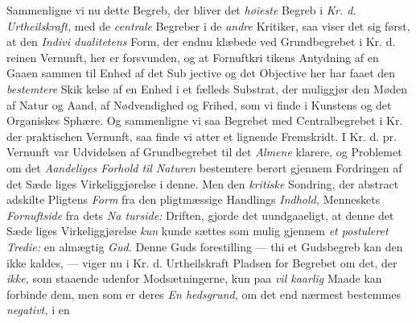 Sammenligne vi nu dette Begreb, der bliver det \emph{høieste}
Begreb i \emph{Kr. d. Urtheilskraft,} med de \emph{centrale} Begreber
i de \emph{andre} Kritiker, saa viser det sig først, at den \emph{Indivi\-%
dualitetens} Form, der endnu klæbede ved Grundbegrebet i
Kr. d. reinen Vernunft, her er forsvunden, og at Fornuftkri\-%
tikens Antydning af en Gaaen sammen til Enhed af det Sub\-%
jective og det Objective her har faaet den \emph{bestemtere} Skik\-%
kelse af en Enhed i et fælleds Substrat, der muliggjør den
Møden af Natur og Aand, af Nødvendighed og Frihed, som vi
finde i Kunstens og det Organiskes Sphære. Og sammenligne
vi saa Begrebet med Centralbegrebet i Kr. der praktischen
Vernunft, saa finde vi atter et lignende Fremskridt. I Kr. d.
pr. Vernunft var Udvidelsen af Grundbegrebet til det \emph{Almene}
klarere, og Problemet om det \emph{Aandeliges Forhold til
Naturen} bestemtere berørt gjennem Fordringen af det Sæde\-%
liges Virkeliggjørelse i denne. Men den \emph{kritiske} Sondring,
der abstract adskilte Pligtens \emph{Form} fra den pligtmæssige
Handlings \emph{Indhold,} Menneskets \emph{Fornuftside} fra dets \emph{Na\-%
turside:} Driften, gjorde det uundgaaeligt, at denne det Sæde\-%
liges Virkeliggjørelse \emph{kun} kunde sættes som mulig gjennem
\emph{et postuleret Tredie:} en almægtig \emph{Gud.} Denne Guds\-%
forestilling --- thi et Gudsbegreb kan den ikke kaldes, --- viger
nu i Kr. d. Urtheilskraft Pladsen for Begrebet om det, der
 \setcounter{footnote}{0}%
\emph{ikke,} som staaende udenfor Modsætningerne, kun paa \emph{vil\-%
kaarlig} Maade kan forbinde dem, men som er deres \emph{En\-%
hedsgrund,} om det end nærmest bestemmes \emph{negativt,} i en
